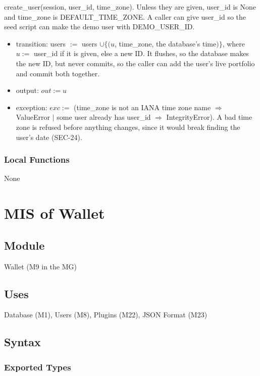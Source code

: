 \documentclass[12pt, titlepage]{article}
\begin{document}
{\raggedright
\noindent create\_user(session, user\_id, time\_zone). Unless they are given,
user\_id is None and time\_zone is DEFAULT\_TIME\_ZONE. A caller can give
user\_id so the seed script can make the demo user with DEMO\_USER\_ID.\par}
\begin{itemize}
\item transition: users $:=$ users $\cup \{(u$, time\_zone, the database's
  time$)\}$, where $u :=$ user\_id if it is given, else a new ID. It flushes,
  so the database makes the new ID, but never commits, so the caller can add
  the user's live portfolio and commit both together.
\item output: $out := u$
\item exception: $exc :=$ (time\_zone is not an IANA time zone name
  $\Rightarrow$ ValueError $|$ some user already has user\_id $\Rightarrow$
  IntegrityError). A bad time zone is refused before anything changes,
  since it would break finding the user's date (SEC-24).
\end{itemize}

\subsubsection{Local Functions}

None

\newpage

\section{MIS of Wallet} \label{MisWallet}

\subsection{Module}

Wallet (M9 in the MG)

\subsection{Uses}

Database (M1), Users (M8), Plugins (M22), JSON Format (M23)

\subsection{Syntax}

\subsubsection{Exported Types}
\end{document}
